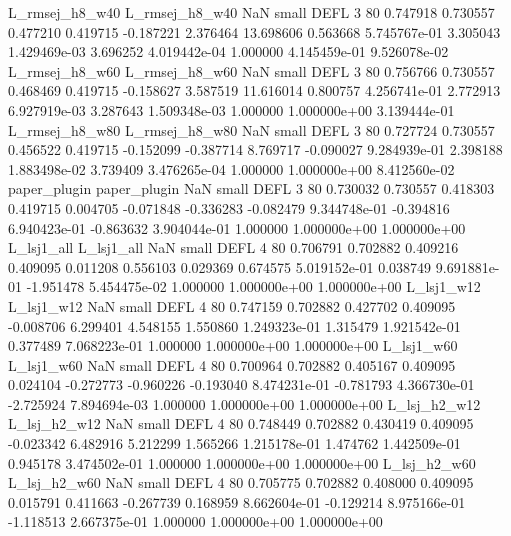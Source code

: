 L_rmsej_h8_w40 L_rmsej_h8_w40                   NaN      small     DEFL                 3 80 0.747918       0.730557 0.477210       0.419715   -0.187221      2.376464     13.698606     0.563668   5.745767e-01  3.305043 1.429469e-03     3.696252   4.019442e-04            1.000000    4.145459e-01        9.526078e-02
L_rmsej_h8_w60 L_rmsej_h8_w60                   NaN      small     DEFL                 3 80 0.756766       0.730557 0.468469       0.419715   -0.158627      3.587519     11.616014     0.800757   4.256741e-01  2.772913 6.927919e-03     3.287643   1.509348e-03            1.000000    1.000000e+00        3.139444e-01
L_rmsej_h8_w80 L_rmsej_h8_w80                   NaN      small     DEFL                 3 80 0.727724       0.730557 0.456522       0.419715   -0.152099     -0.387714      8.769717    -0.090027   9.284939e-01  2.398188 1.883498e-02     3.739409   3.476265e-04            1.000000    1.000000e+00        8.412560e-02
  paper_plugin   paper_plugin                   NaN      small     DEFL                 3 80 0.730032       0.730557 0.418303       0.419715    0.004705     -0.071848     -0.336283    -0.082479   9.344748e-01 -0.394816 6.940423e-01    -0.863632   3.904044e-01            1.000000    1.000000e+00        1.000000e+00
    L_lsj1_all     L_lsj1_all                   NaN      small     DEFL                 4 80 0.706791       0.702882 0.409216       0.409095    0.011208      0.556103      0.029369     0.674575   5.019152e-01  0.038749 9.691881e-01    -1.951478   5.454475e-02            1.000000    1.000000e+00        1.000000e+00
    L_lsj1_w12     L_lsj1_w12                   NaN      small     DEFL                 4 80 0.747159       0.702882 0.427702       0.409095   -0.008706      6.299401      4.548155     1.550860   1.249323e-01  1.315479 1.921542e-01     0.377489   7.068223e-01            1.000000    1.000000e+00        1.000000e+00
    L_lsj1_w60     L_lsj1_w60                   NaN      small     DEFL                 4 80 0.700964       0.702882 0.405167       0.409095    0.024104     -0.272773     -0.960226    -0.193040   8.474231e-01 -0.781793 4.366730e-01    -2.725924   7.894694e-03            1.000000    1.000000e+00        1.000000e+00
  L_lsj_h2_w12   L_lsj_h2_w12                   NaN      small     DEFL                 4 80 0.748449       0.702882 0.430419       0.409095   -0.023342      6.482916      5.212299     1.565266   1.215178e-01  1.474762 1.442509e-01     0.945178   3.474502e-01            1.000000    1.000000e+00        1.000000e+00
  L_lsj_h2_w60   L_lsj_h2_w60                   NaN      small     DEFL                 4 80 0.705775       0.702882 0.408000       0.409095    0.015791      0.411663     -0.267739     0.168959   8.662604e-01 -0.129214 8.975166e-01    -1.118513   2.667375e-01            1.000000    1.000000e+00        1.000000e+00
